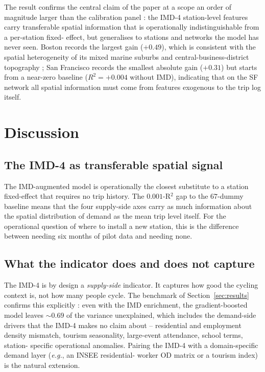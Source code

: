 \documentclass[11pt,a4paper]{article}
\begin{document}
The result confirms the central claim of the paper at a scope an
order of magnitude larger than the calibration panel : the IMD-4
station-level features carry transferable spatial information
that is operationally indistinguishable from a per-station fixed-
effect, but generalises to stations and networks the model has
never seen.  Boston records the largest gain ($+0.49$), which is
consistent with the spatial heterogeneity of its mixed marine
suburbs and central-business-district topography ; San Francisco
records the smallest absolute gain ($+0.31$) but starts from a
near-zero baseline ($R^2 = +0.004$ without IMD), indicating that
on the SF network all spatial information must come from features
exogenous to the trip log itself.

\section{Discussion}
\label{sec:discussion}

\subsection{The IMD-4 as transferable spatial signal}

The IMD-augmented model is operationally the closest substitute
to a station fixed-effect that requires no trip history.  The
$0.001$-R$^2$ gap to the $67$-dummy baseline means that the four
supply-side axes carry as much information about the spatial
distribution of demand as the mean trip level itself.  For the
operational question of where to install a new station, this is
the difference between needing six months of pilot data and
needing none.

\subsection{What the indicator does and does not capture}

The IMD-4 is by design a \emph{supply-side} indicator.  It
captures how good the cycling context is, not how many people
cycle.  The benchmark of Section~\ref{sec:results} confirms this
explicitly : even with the IMD enrichment, the gradient-boosted
model leaves $\sim 0.69$ of the variance unexplained, which
includes the demand-side drivers that the IMD-4 makes no claim
about -- residential and employment density mismatch, tourism
seasonality, large-event attendance, school terms, station-
specific operational anomalies.  Pairing the IMD-4 with a
domain-specific demand layer (\emph{e.g.}, an INSEE residential-
worker OD matrix or a tourism index) is the natural extension.
\end{document}
